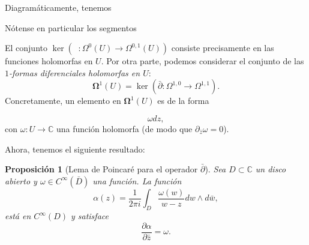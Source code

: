 \documentclass[autocontact]{gaceta}
\newtheorem{prop}[thm]{Proposición}
\theoremstyle{definition} \newtheorem{defn}[thm]{Definición}
\theoremstyle{definition} \newtheorem{ejemplo}[thm]{Ejemplo}
\theoremstyle{definition} \newtheorem{ejercicio}[thm]{Ejercicio}
\def\CC{\mathbb{C}}
\DeclareMathOperator{\delbar}{\bar{\partial}}
\begin{document}
	  
	  Diagramáticamente, tenemos
	  
	  \begin{center}      
	        \end{center}

	  Nótense en particular los segmentos
\begin{center}  \end{center}
El conjunto $\ker(\delbar:\Omega^0(U) \rightarrow \Omega^{0,1}(U))$ consiste precisamente en las funciones holomorfas en $U$. Por otra parte, podemos considerar el conjunto de las \emph{$1$-formas diferenciales holomorfas en $U$}:
\begin{equation*}  \boldsymbol{\Omega}^1(U) = \ker(\bar{\partial}: \Omega^{1,0} \rightarrow \Omega^{1,1}).\end{equation*}
Concretamente, un elemento en $\boldsymbol{\Omega}^1(U)$ es de la forma

\begin{equation*}  \omega dz,\end{equation*} con $\omega:U\rightarrow \CC$ una función holomorfa (de modo que $\partial_{\bar{z}}\omega=0$).

Ahora, tenemos el siguiente resultado:

\begin{prop}[Lema de Poincaré para el operador $\bar{\partial}$]  Sea $D\subset \CC$ un disco abierto y $\omega \in C^\infty(\bar{D})$ una función. La función  \begin{equation*}    \alpha(z) = \frac{1}{2\pi i}\int_D \frac{\omega(w)}{w-z} dw \wedge d\bar{w},  \end{equation*}  está en $C^\infty(D)$ y satisface  \begin{equation*}    \frac{\partial \alpha}{\partial \bar{z}}=\omega.  \end{equation*}\end{prop}
\end{document}
